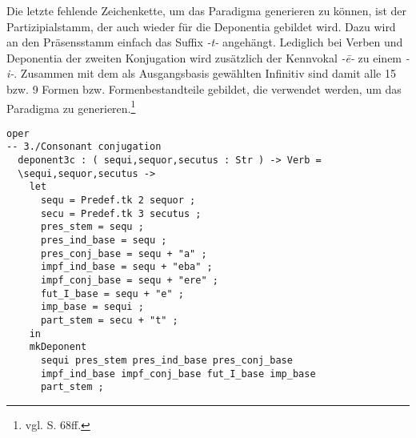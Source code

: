Die letzte fehlende Zeichenkette, um das Paradigma generieren zu können, ist der Partizipialstamm, der auch wieder für die Deponentia gebildet wird. Dazu wird an den Präsensstamm einfach das Suffix \textit{-t-} angehängt. Lediglich bei Verben und Deponentia der zweiten Konjugation wird zusätzlich der Kennvokal \textit{-ē-} zu einem \textit{-i-}. Zusammen mit dem als Ausgangsbasis gewählten Infinitiv sind damit alle 15 bzw. 9 Formen bzw. Formenbestandteile gebildet, die verwendet werden, um das Paradigma zu generieren.\footnote{vgl. \cite{BAYER-LINDAUER1994} S. 68ff.} \par
\begin{lstlisting}[float=h!tp,caption={Bildung der Wortstämme und -stöcke für Deponentia der dritten Konjugation mit konsonantischem Stamm (vgl. \textbf{MorphoLat.gf})},label={GF-Morpho-Deponent3c},basicstyle=\small]
oper
-- 3./Consonant conjugation
  deponent3c : ( sequi,sequor,secutus : Str ) -> Verb = 
  \sequi,sequor,secutus ->
    let
      sequ = Predef.tk 2 sequor ;
      secu = Predef.tk 3 secutus ; 
      pres_stem = sequ ;
      pres_ind_base = sequ ;
      pres_conj_base = sequ + "a" ;
      impf_ind_base = sequ + "eba" ;
      impf_conj_base = sequ + "ere" ;
      fut_I_base = sequ + "e" ;
      imp_base = sequi ;
      part_stem = secu + "t" ;
    in
    mkDeponent 
      sequi pres_stem pres_ind_base pres_conj_base 
      impf_ind_base impf_conj_base fut_I_base imp_base 
      part_stem ;
\end{lstlisting}
